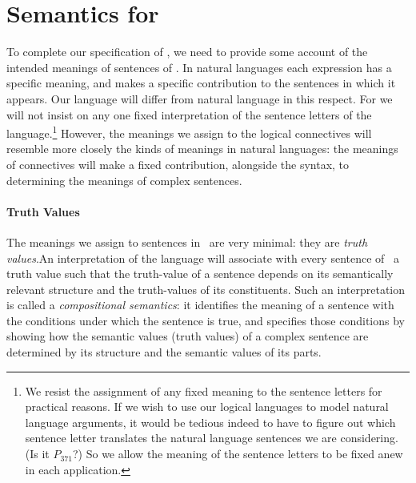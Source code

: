 



\section{Semantics for \lone}

To complete our specification of \lone, we need to provide some account of the intended meanings of sentences of \lone. In natural languages each expression has a specific meaning, and makes a specific contribution to the sentences in which it appears. Our language will differ from natural language in this respect. For we will not insist on any one fixed interpretation of the sentence letters of the language.\footnote{We resist the assignment of any fixed meaning to the sentence letters for practical reasons. If we wish to use our logical languages to model natural language arguments, it would be tedious indeed to have to figure out which sentence letter translates the natural language sentences we are considering. (Is it $P_{371}$?) So we allow the meaning of the sentence letters to be fixed anew in each application.} However, the meanings we assign to the logical connectives will resemble more closely the kinds of meanings in natural languages: the meanings of connectives will make a fixed contribution, alongside the syntax, to determining the meanings of complex sentences.

\paragraph{Truth Values}The meanings we assign to sentences in \lone\ are very minimal: they are \emph{truth values}.An interpretation of the language will  associate with every sentence of \lone\ a truth value such that the truth-value of a sentence depends on its semantically relevant structure and the truth-values of its constituents.  Such an interpretation is called a \emph{compositional semantics}: it identifies the meaning of a sentence with the conditions under which the sentence is true, and specifies those conditions by showing how the semantic values (truth values) of a complex sentence are determined by its structure and the semantic values of its parts.


